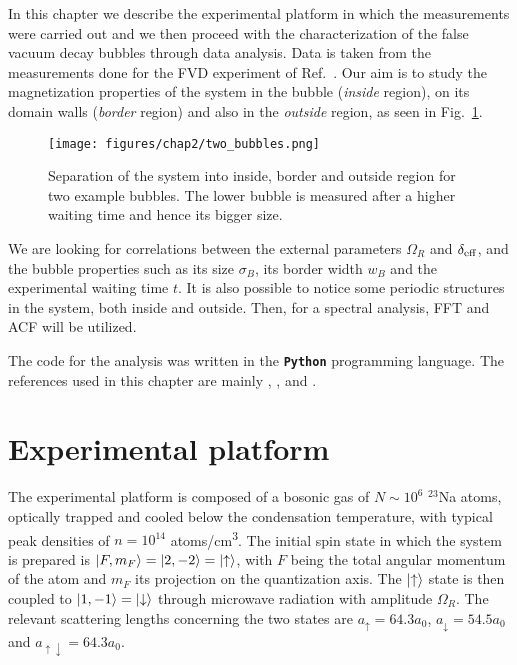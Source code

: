 In this chapter we describe the experimental platform in which the measurements were carried out and we then proceed with the characterization of the false vacuum decay bubbles through data analysis. Data is taken from the measurements done for the FVD experiment of Ref.\ \cite{zenesini2024false}. Our aim is to study the magnetization properties of the system in the bubble (\textit{inside} region), on its domain walls (\textit{border} region) and also in the \textit{outside} region, as seen in Fig.\ \ref{fig:2bubbles}. 
\begin{figure}[ht!]
    \centering
    \texttt{[image: figures/chap2/two\_bubbles.png]}
    \caption{Separation of the system into inside, border and outside region for two example bubbles. The lower bubble is measured after a higher waiting time and hence its bigger size.}
    \label{fig:2bubbles}
\end{figure}
We are looking for correlations between the external parameters $\Omega_R$ and $\delta_{\rm eff}$, and the bubble properties such as its size $\sigma_B$, its border width $w_B$ and the experimental waiting time $t$. It is also possible to notice some periodic structures in the system, both inside and outside. Then, for a spectral analysis, FFT and ACF will be utilized. 

The code for the analysis was written in the \textbf{\texttt{Python}} programming language. The references used in this chapter are mainly \cite{cominotti2023ferro}, \cite{farolfi2021}, \cite{cominotti2023experiments} and \cite{cominotti2024ultracold}.

\section{Experimental platform}
The experimental platform is composed of a bosonic gas of $N \sim 10^6$ $^{23}$Na atoms, optically trapped and cooled below the condensation temperature, with typical peak densities of $n = 10^{14}$ atoms/\unit{\centi\meter\cubed}. The initial spin state in which the system is prepared is $\ket{F, m_F} = \ket{2, -2} = \ket{\uparrow}$, with $F$ being the total angular momentum of the atom 
and $m_F$ its projection on the quantization axis. The $\ket{\uparrow}$ state is then coupled to $\ket{1, -1} = \ket{\downarrow}$ through microwave radiation with amplitude $\Omega_R$. The relevant scattering lengths concerning the two states are $a_\uparrow = 64.3 a_0$, $a_\downarrow = 54.5 a_0$ and $a_{\uparrow\downarrow} = 64.3 a_0$.

